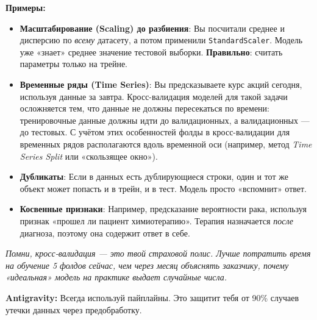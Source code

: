 \documentclass[12pt]{article}
\newcommand{\commentary}[1]{{\small\itshape\color{commentgray} #1}}
\newcommand{\antigravity}[1]{{\small\color{antigravityblue}\textbf{Antigravity:} #1}}
\begin{document}
\textbf{Примеры:}
\begin{itemize}
    \item \textbf{Масштабирование (Scaling) до разбиения}: Вы посчитали среднее и дисперсию по \textit{всему} датасету, а потом применили \texttt{StandardScaler}. Модель уже «знает» среднее значение тестовой выборки. \textbf{Правильно}: считать параметры только на трейне.
    \item \textbf{Временные ряды (Time Series)}: Вы предсказываете курс акций сегодня, используя данные за завтра. Кросс-валидация моделей для такой задачи осложняется тем, что данные не должны пересекаться по времени: тренировочные данные должны идти до валидационных, а валидационных — до тестовых. С учётом этих особенностей фолды в кросс-валидации для временных рядов располагаются вдоль временной оси (например, метод \textit{Time Series Split} или «скользящее окно»).
    \item \textbf{Дубликаты}: Если в данных есть дублирующиеся строки, один и тот же объект может попасть и в трейн, и в тест. Модель просто «вспомнит» ответ.
    \item \textbf{Косвенные признаки}: Например, предсказание вероятности рака, используя признак «прошел ли пациент химиотерапию». Терапия назначается \textit{после} диагноза, поэтому она содержит ответ в себе.
\end{itemize}

\vspace{1cm}
\commentary{Помни, кросс-валидация — это твой страховой полис. Лучше потратить время на обучение 5 фолдов сейчас, чем через месяц объяснять заказчику, почему «идеальная» модель на практике выдает случайные числа.}

\antigravity{Всегда используй пайплайны. Это защитит тебя от 90\% случаев утечки данных через предобработку.}
\end{document}
